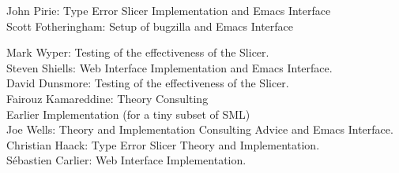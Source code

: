 \documentclass{report}
\begin{document}
	John Pirie: Type Error Slicer Implementation and Emacs Interface\\

        Scott Fotheringham: Setup of bugzilla and Emacs Interface

        Mark Wyper: Testing of the effectiveness of the Slicer.\\

	Steven Shiells: Web Interface Implementation and Emacs Interface.\\

	David Dunsmore: Testing of the effectiveness of the Slicer.\\

	Fairouz Kamareddine: Theory Consulting\\

Earlier Implementation (for a tiny subset of SML)\\

	Joe Wells: Theory and Implementation Consulting Advice and Emacs
	    	   Interface.\\

	Christian Haack: Type Error Slicer Theory and Implementation.\\

	Sébastien Carlier: Web Interface Implementation.
\end{document}
